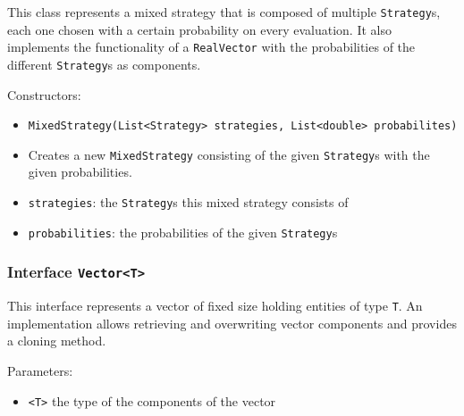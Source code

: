 \documentclass[parskip=full,11pt]{scrartcl}
\begin{document}
This class represents a mixed strategy that is composed of multiple \texttt{Strategy}s, each one chosen with a certain probability on every evaluation. It also implements the functionality of a \texttt{RealVector} with the probabilities of the different \texttt{Strategy}s as components.

Constructors:
\begin{itemize}\itemsep -10pt
\item \texttt{MixedStrategy(List<Strategy> strategies, List<double> probabilites)}
\item[] Creates a new \texttt{MixedStrategy} consisting of the given \texttt{Strategy}s with the given probabilities.
\item[] \texttt{strategies}: the \texttt{Strategy}s this mixed strategy consists of
\item[] \texttt{probabilities}: the probabilities of the given \texttt{Strategy}s
\end{itemize}

\subsubsection{Interface \texttt{Vector<T>}}
This interface represents a vector of fixed size holding entities of type \texttt{T}. An implementation allows retrieving and overwriting vector components and provides a cloning method.

Parameters:
\begin{itemize}\itemsep -10pt
\item \texttt{<T>} the type of the components of the vector
\end{itemize}
\end{document}
